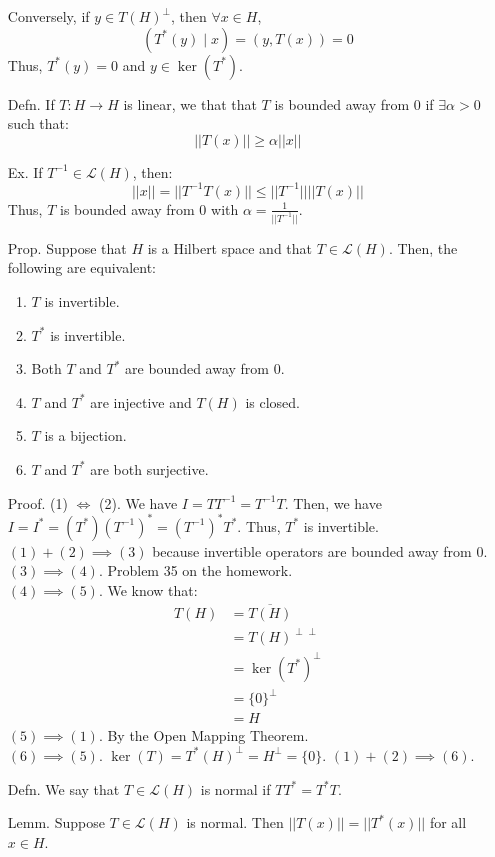 \documentclass[12pt]{article}
\begin{document}
\begin{itemize}
    Conversely, if $y \in T(H)^\perp$, then $\forall x \in H$, 
    \[(T^*(y) \mid x) = (y, T(x)) = 0\]
    Thus, $T^*(y) = 0$ and $y \in \ker(T^*)$.
    \item[Defn.] If $T: H \to H$ is linear, we that that $T$ is bounded away from $0$ if $\exists \alpha > 0$ such that: 
    \[ ||T(x)|| \geq \alpha ||x||\]
    \item[Ex.] If $T^{-1} \in \mathcal L(H)$, then: 
    \[ ||x|| = ||T^{-1}T(x)|| \leq ||T^{-1}||||T(x)||\]
    Thus, $T$ is bounded away from $0$ with $\alpha = \frac{1}{||T^{-1}||}$.
    \item[Prop.] Suppose that $H$ is a Hilbert space and that $T \in \mathcal L(H)$. Then, the following are equivalent: 
    \begin{enumerate}
        \item $T$ is invertible.
        \item $T^*$ is invertible.
        \item Both $T$ and $T^*$ are bounded away from $0$.
        \item $T$ and $T^*$ are injective and $T(H)$ is closed. 
        \item $T$ is a bijection. 
        \item $T$ and $T^*$ are both surjective.
    \end{enumerate}
    Proof. (1) $\iff$ (2). We have $I = TT^{-1} = T^{-1}T$. Then, 
    we have $I = I^* = (T^*)(T^{-1})^* = (T^{-1})^*T^*$. Thus, $T^*$ is invertible. \\
    $(1) + (2) \implies (3)$ because invertible operators are bounded away from $0$. \\
    $(3) \implies (4)$. Problem 35 on the homework. \\
    $(4) \implies (5)$. We know that: 
    \begin{align*}
        T(H) &= \overline{T(H)} \\
        &= T(H)^{\perp\perp} \\
        &= \ker(T^*)^\perp \\
        &= \{0\}^\perp \\
        &= H
    \end{align*}
    $(5) \implies (1)$. By the Open Mapping Theorem. \\
    $(6) \implies (5)$. $\ker(T) = T^*(H)^\perp = H^\perp = \{0\}$.
    $(1) + (2) \implies (6)$.
    \item[Defn.] We say that $T \in \mathcal L(H)$ is normal if $TT^* = T^*T$. 
    \item[Lemm.] Suppose $T \in \mathcal L(H)$ is normal. Then $||T(x)|| = ||T^*(x)||$ for all $x \in H$.
\end{itemize}
\end{document}
